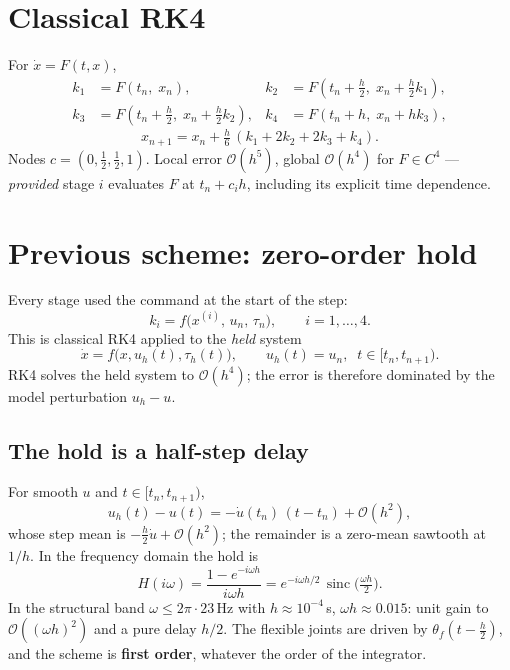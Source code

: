 \documentclass[11pt]{article}
\begin{document}
\section{Classical RK4}

For $\dot x=F(t,x)$,
\begin{align*}
  k_1&=F(t_n,\;x_n), &
  k_2&=F(t_n+\tfrac h2,\;x_n+\tfrac h2k_1),\\
  k_3&=F(t_n+\tfrac h2,\;x_n+\tfrac h2k_2), &
  k_4&=F(t_n+h,\;x_n+hk_3),
\end{align*}
\begin{equation}
  x_{n+1}=x_n+\tfrac h6\,(k_1+2k_2+2k_3+k_4).
\end{equation}
Nodes $c=(0,\tfrac12,\tfrac12,1)$. Local error $\mathcal O(h^5)$, global $\mathcal O(h^4)$ for
$F\in C^4$ --- \emph{provided} stage $i$ evaluates $F$ at $t_n+c_ih$, including its explicit
time dependence.

\section{Previous scheme: zero-order hold}

Every stage used the command at the start of the step:
\begin{equation}
  k_i=f\big(x^{(i)},\,u_n,\,\tau_n\big),\qquad i=1,\dots,4.
\end{equation}
This is classical RK4 applied to the \emph{held} system
\begin{equation}
  \dot x=f\big(x,u_h(t),\tau_h(t)\big),\qquad u_h(t)=u_n,\;\; t\in[t_n,t_{n+1}).
\end{equation}
RK4 solves the held system to $\mathcal O(h^4)$; the error is therefore dominated by the model
perturbation $u_h-u$.

\subsection{The hold is a half-step delay}\label{sec:hold}

For smooth $u$ and $t\in[t_n,t_{n+1})$,
\begin{equation}
  u_h(t)-u(t)=-\dot u(t_n)\,(t-t_n)+\mathcal O(h^2),
\end{equation}
whose step mean is $-\tfrac h2\dot u+\mathcal O(h^2)$; the remainder is a zero-mean sawtooth at
$1/h$. In the frequency domain the hold is
\begin{equation}
  H(i\omega)=\frac{1-e^{-i\omega h}}{i\omega h}
  =e^{-i\omega h/2}\,\operatorname{sinc}\!\big(\tfrac{\omega h}{2}\big).
\end{equation}
In the structural band $\omega\le2\pi\cdot23$\,Hz with $h\approx10^{-4}$\,s, $\omega h\approx0.015$:
unit gain to $\mathcal O((\omega h)^2)$ and a pure delay $h/2$. The flexible joints are driven by
$\theta_f(t-\tfrac h2)$, and the scheme is \textbf{first order}, whatever the order of the
integrator.
\end{document}
